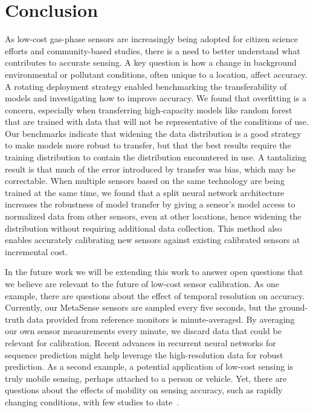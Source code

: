 \documentclass[journal abbreviation, manuscript]{copernicus}
\begin{document}
\section{Conclusion}

As low-cost gas-phase sensors are increasingly being adopted for citizen science efforts and community-based studies, there is a need to better understand what contributes to accurate sensing.  A key question is how a change in background environmental or pollutant conditions, often unique to a location, affect accuracy.  A rotating deployment strategy enabled benchmarking the transferability of models and investigating how to improve accuracy. We found that overfitting is a concern, especially when transferring high-capacity models like random forest that are trained with data that will not be representative of the conditions of use. Our benchmarks indicate that widening the data distribution is a good strategy to make models more robust to transfer, but that the best results require the training distribution to contain the distribution encountered in use.  A tantalizing result is that much of the error introduced by transfer was bias, which may be correctable.  When multiple sensors based on the same technology are being trained at the same time, we found that a split neural network architecture increases the robustness of model transfer by giving a sensor's model access to normalized data from other sensors, even at other locations, hence widening the distribution without requiring additional data collection.  This method also enables accurately calibrating new sensors against existing calibrated sensors at incremental cost.

In the future work we will be extending this work to answer open questions that we believe are relevant to the future of low-cost sensor calibration.  As one example, there are questions about the effect of temporal resolution on accuracy. Currently, our MetaSense sensors are sampled every five seconds, but the ground-truth data provided from reference monitors is minute-averaged. By averaging our own sensor measurements every minute, we discard data that could be relevant for calibration. Recent advances in recurrent neural networks for sequence prediction might help leverage the high-resolution data for robust prediction. As a second example, a potential application of low-cost sensing is truly mobile sensing, perhaps attached to a person or vehicle.  Yet, there are questions about the effects of mobility on sensing accuracy, such as rapidly changing conditions, with few studies to date~\cite{cite,cite}.
\end{document}
